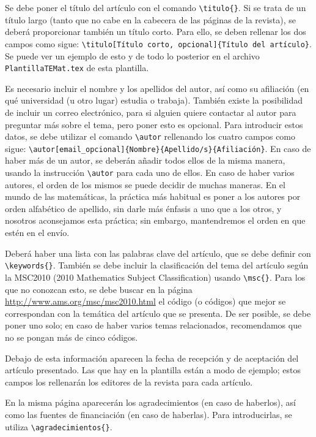 \documentclass[%
extracommands,%
]{revistaanem}
\begin{document}
Se debe poner el título del artículo con el comando \verb+\titulo{}+.
Si se trata de un título largo (tanto que no cabe en la cabecera de las páginas de la revista), se deberá proporcionar también un título corto.
Para ello, se deben rellenar los dos campos como sigue: \verb+\titulo[Título corto, opcional]{Título del artículo}+.
Se puede ver un ejemplo de esto y de todo lo posterior en el archivo \verb+PlantillaTEMat.tex+ de esta plantilla.

Es necesario incluir el nombre y los apellidos del autor, así como su afiliación (en qué universidad (u otro lugar) estudia o trabaja).
También existe la posibilidad de incluir un correo electrónico, para si alguien quiere contactar al autor para preguntar más sobre el tema, pero poner esto es opcional.
Para introducir estos datos, se debe utilizar el comando \verb+\autor+ rellenando los cuatro campos como sigue: \verb+\autor[email_opcional]{Nombre}{Apellido/s}{Afiliación}+.
En caso de haber más de un autor, se deberán añadir todos ellos de la misma manera, usando la instrucción \verb+\autor+ para cada uno de ellos.
En caso de haber varios autores, el orden de los mismos se puede decidir de muchas maneras.
En el mundo de las matemáticas, la práctica más habitual es poner a los autores por orden alfabético de apellido, sin darle más énfasis a uno que a los otros, y nosotros aconsejamos esta práctica; sin embargo, mantendremos el orden en que estén en el envío.

Deberá haber una lista con las palabras clave del artículo, que se debe definir con \verb+\keywords{}+.
También se debe incluir la clasificación del tema del artículo según la MSC2010 (2010 Mathematics Subject Classification) usando \verb+\msc{}+.
Para los que no conozcan esto, se debe buscar en la página \url{http://www.ams.org/msc/msc2010.html} el código (o códigos) que mejor se correspondan con la temática del artículo que se presenta.
De ser posible, se debe poner uno solo; en caso de haber varios temas relacionados, recomendamos que no se pongan más de cinco códigos.

Debajo de esta información aparecen la fecha de recepción y de aceptación del artículo presentado.
Las que hay en la plantilla están a modo de ejemplo; estos campos los rellenarán los editores de la revista para cada artículo.

En la misma página aparecerán los agradecimientos (en caso de haberlos), así como las fuentes de financiación (en caso de haberlas).
Para introducirlas, se utiliza \verb+\agradecimientos{}+.
\end{document}
